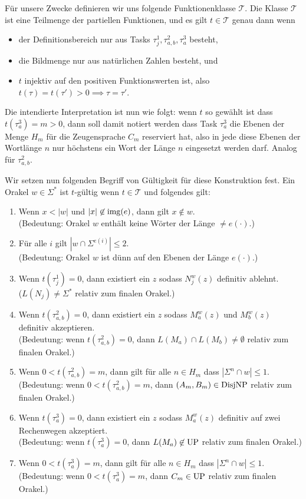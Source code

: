 Für unsere Zwecke definieren wir uns folgende Funktionenklasse $\mathcal T$. Die Klasse $\mathcal T$ ist eine Teilmenge der partiellen Funktionen, und es gilt $t\in\mathcal T$ genau dann wenn 
\begin{itemize}[nosep]
    \item der Definitionsbereich nur aus Tasks $\tau^1_j, \tau^2_{a,b}, \tau^3_a$ besteht, 
    \item die Bildmenge nur aus natürlichen Zahlen besteht, und
    \item $t$ injektiv auf den positiven Funktionswerten ist, also $t(\tau)=t(\tau')>0 \implies \tau=\tau'$.
\end{itemize}
Die intendierte Interpretation ist nun wie folgt: wenn $t$ so gewählt ist dass $t(\tau^3_a)=m>0$, dann soll damit notiert werden dass Task $\tau^3_a$ die Ebenen der Menge $H_m$ für die Zeugensprache $C_m$ reserviert hat, also in jede diese Ebenen der Wortlänge $n$ nur höchstens ein Wort der Länge $n$ eingesetzt werden darf. Analog für $\tau^2_{a,b}$.

Wir setzen nun folgenden Begriff von Gültigkeit für diese Konstruktion fest.
Ein Orakel $w\in\Sigma^*$ ist $t$-gültig wenn $t\in\mathcal T$ und folgendes gilt:
\begin{enumerate}[label={V\arabic*}]
    \item Wenn $x<|w|$ und $|x|\not\in \operatorname{img}(e)$, dann gilt $x\not\in w$.\\
        (Bedeutung: Orakel $w$ enthält keine Wörter der Länge $\neq e(\cdot)$.)
    \item Für alle $i$ gilt $|w\cap \Sigma^{e(i)}|\leq 2$.\\
        (Bedeutung: Orakel $w$ ist dünn auf den Ebenen der Länge $e(\cdot)$.)
    \item Wenn $t(\tau^1_j)=0$, dann existiert ein $z$ sodass $N_j^w(z)$ definitiv ablehnt.\\
        ($L(N_j)\neq \Sigma^*$ relativ zum finalen Orakel.)
    \item Wenn $t(\tau^2_{a,b})=0$, dann existiert ein $z$ sodass $M_a^w(z)$ und $M_b^w(z)$ definitiv akzeptieren.\\
        (Bedeutung: wenn $t(\tau^2_{a,b})=0$, dann $L(M_a)\cap L(M_b)\neq \emptyset$ relativ zum finalen Orakel.)
    \item Wenn $0<t(\tau^2_{a,b})=m$, dann gilt für alle $n\in H_m$ dass $|\Sigma^{n}\cap w|\leq 1$.\\
        (Bedeutung: wenn $0<t(\tau^2_{a,b})=m$, dann $(A_m,B_m)\in\mathrm{DisjNP}$ relativ zum finalen Orakel.)
    \item Wenn $t(\tau^3_{a})=0$, dann existiert ein $z$ sodass $M_a^w(z)$ definitiv auf zwei Rechenwegen akzeptiert.\\
        (Bedeutung: wenn $t(\tau^3_{a})=0$, dann $L(M_a)\not\in \mathrm{UP}$ relativ zum finalen Orakel.)
    \item Wenn $0<t(\tau^3_{a})=m$, dann gilt für alle $n\in H_m$ dass $|\Sigma^n\cap w|\leq 1$.\\
        (Bedeutung: wenn $0<t(\tau^3_{a})=m$, dann $C_m\in\mathrm{UP}$ relativ zum finalen Orakel.)
\end{enumerate}


